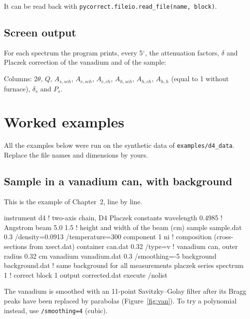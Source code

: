 \documentclass[11pt,a4paper]{report}
\newcommand{\code}[1]{\texttt{#1}}
\newcommand{\file}[1]{\texttt{#1}}
\begin{document}
It can be read back with \code{pycorrect.fileio.read\_file(name, block)}.

\section{Screen output}

For each spectrum the program prints, every 5$^\circ$, the attenuation factors,
$\delta$ and Placzek correction of the vanadium and of the sample:



Columns: $2\theta$, $Q$, $A_{s,sch}$, $A_{c,sch}$, $A_{c,ch}$, $A_{h,sch}$,
$A_{h,ch}$, $A_{h,h}$ (equal to 1 without furnace), $\delta_s$ and $P_s$.

\chapter{Worked examples}
\label{chap:examples}

All the examples below were run on the synthetic data of
\file{examples/d4\_data}. Replace the file names and dimensions by yours.

\section{Sample in a vanadium can, with background}

This is the example of Chapter~2, line by line.

\begin{com}
instrument d4                         ! two-axis chain, D4 Placzek constants
wavelength 0.4985                     ! Angstrom
beam 5.0 1.5                          ! height and width of the beam (cm)
sample sample.dat 0.3 /density=0.0913 /temperature=300
component 1 ni                        ! composition (cross-sections from xsect.dat)
container can.dat 0.32 /type=v        ! vanadium can, outer radius 0.32 cm
vanadium vanadium.dat 0.3 /smoothing=-5
background background.dat             ! same background for all measurements
placzek series
spectrum 1                            ! correct block 1
output corrected.dat
execute /nolist
\end{com}

The vanadium is smoothed with an 11-point Savitzky--Golay filter after its Bragg
peaks have been replaced by parabolas (Figure~\ref{fig:van}). To try a
polynomial instead, use \code{/smoothing=4} (cubic).
\end{document}

